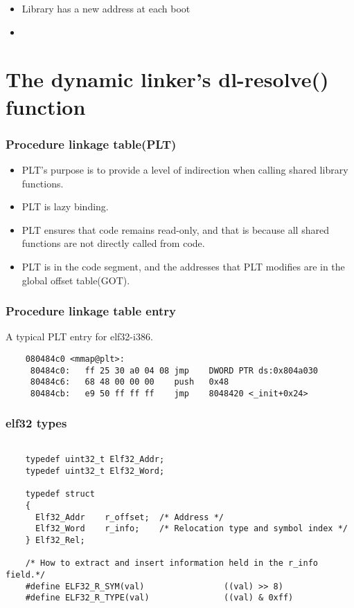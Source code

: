 \documentclass[10pt]{beamer}
\begin{document}
\begin{frame}
\begin{itemize}
\item Library has a new address at each boot
\item 
\end{itemize}

\end{frame}



\section{The dynamic linker's dl-resolve() function}  %

\begin{frame}[fragile]
\frametitle{Procedure linkage table(PLT)}

 \begin{itemize}
    \item PLT's purpose is to provide a level of indirection when calling shared library functions.
    \item PLT is lazy binding.
    \item PLT ensures that code remains read-only, and that is because all shared functions are not directly called from code.
    \item PLT is in the code segment, and the addresses that PLT modifies are in the global offset table(GOT).
  \end{itemize}

\end{frame}

\begin{frame}[fragile]
\frametitle{Procedure linkage table entry}
A typical PLT entry for elf32-i386.
	\begin{verbatim}
	080484c0 <mmap@plt>:
	 80484c0:	ff 25 30 a0 04 08 jmp    DWORD PTR ds:0x804a030
	 80484c6:	68 48 00 00 00    push   0x48
	 80484cb:	e9 50 ff ff ff    jmp    8048420 <_init+0x24>
	\end{verbatim}


\end{frame}

\begin{frame}[fragile]
\frametitle{elf32 types}

	\footnotesize
	\begin{verbatim}

	typedef uint32_t Elf32_Addr;
	typedef uint32_t Elf32_Word;

	typedef struct
	{
	  Elf32_Addr    r_offset;  /* Address */
	  Elf32_Word    r_info;    /* Relocation type and symbol index */
	} Elf32_Rel;

	/* How to extract and insert information held in the r_info field.*/
	#define ELF32_R_SYM(val)                ((val) >> 8)
	#define ELF32_R_TYPE(val)               ((val) & 0xff)
	\end{verbatim}
	\normalsize

\end{frame}
\end{document}
